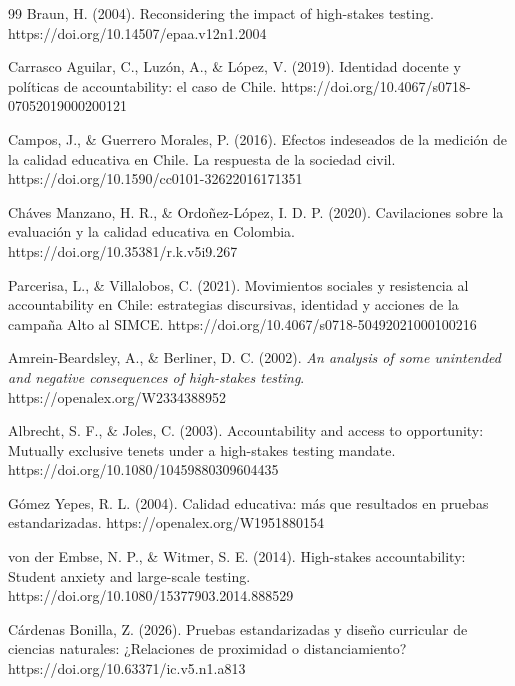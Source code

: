 \documentclass[11pt]{article}
\begin{document}
\begin{thebibliography}{99}
Braun, H. (2004). Reconsidering the impact of high-stakes testing. https://doi.org/10.14507/epaa.v12n1.2004

Carrasco Aguilar, C., Luzón, A., \& López, V. (2019). Identidad docente y políticas de accountability: el caso de Chile. https://doi.org/10.4067/s0718-07052019000200121

Campos, J., \& Guerrero Morales, P. (2016). Efectos indeseados de la medición de la calidad educativa en Chile. La respuesta de la sociedad civil. https://doi.org/10.1590/cc0101-32622016171351

Cháves Manzano, H. R., \& Ordoñez-López, I. D. P. (2020). Cavilaciones sobre la evaluación y la calidad educativa en Colombia. https://doi.org/10.35381/r.k.v5i9.267

Parcerisa, L., \& Villalobos, C. (2021). Movimientos sociales y resistencia al accountability en Chile: estrategias discursivas, identidad y acciones de la campaña Alto al SIMCE. https://doi.org/10.4067/s0718-50492021000100216

Amrein-Beardsley, A., \& Berliner, D. C. (2002). \textit{An analysis of some unintended and negative consequences of high-stakes testing}. https://openalex.org/W2334388952

Albrecht, S. F., \& Joles, C. (2003). Accountability and access to opportunity: Mutually exclusive tenets under a high-stakes testing mandate. https://doi.org/10.1080/10459880309604435

Gómez Yepes, R. L. (2004). Calidad educativa: más que resultados en pruebas estandarizadas. https://openalex.org/W1951880154

von der Embse, N. P., \& Witmer, S. E. (2014). High-stakes accountability: Student anxiety and large-scale testing. https://doi.org/10.1080/15377903.2014.888529

Cárdenas Bonilla, Z. (2026). Pruebas estandarizadas y diseño curricular de ciencias naturales: ¿Relaciones de proximidad o distanciamiento? https://doi.org/10.63371/ic.v5.n1.a813


\end{thebibliography}
\end{document}
